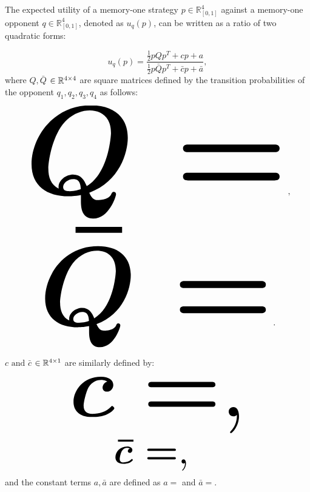 \begin{theorem}\label{theorem:quadratic_form_u}
    The expected utility of a memory-one strategy \(p\in\mathbb{R}_{[0,1]}^4\)
    against a memory-one opponent \(q\in\mathbb{R}_{[0,1]}^4\), denoted
    as \(u_q(p)\), can be written as a ratio of two quadratic forms:

    \begin{equation}\label{eq:optimisation_quadratic}
    u_q(p) = \frac{\frac{1}{2}pQp^T + cp + a}
                {\frac{1}{2}p\bar{Q}p^T + \bar{c}p + \bar{a}},
    \end{equation}
    where \(Q, \bar{Q}\) \(\in \mathbb{R}^{4\times4}\) are square matrices defined by the
    transition probabilities of the opponent \(q_1, q_2, q_3, q_4\) as follows:

    \begin{center}
    \begin{equation}
    \resizebox{0.9\linewidth}{!}{\arraycolsep=2.5pt%
    \boldmath\(
    Q = \)},
    \end{equation}
    \begin{equation}\label{eq:q_bar_matrix}
    \resizebox{0.8\linewidth}{!}{\arraycolsep=2.5pt%
    \boldmath\(
    \bar{Q} =  \)}.
    \end{equation}
    \end{center}

    \(c \text{ and } \bar{c}\) \(\in \mathbb{R}^{4 \times 1}\) are similarly defined by:

    \begin{equation}\label{eq:q_matrix_numerator}
    \resizebox{0.6\linewidth}{!}{\arraycolsep=2.5pt%
    \boldmath\(c = \),}
    \end{equation}
    \begin{equation}\label{eq:q_matrix_denominator}
    \resizebox{0.3\linewidth}{!}{\arraycolsep=2.5pt%
    \boldmath\(\bar{c} = \),
    }
    \end{equation}
    and the constant terms \(a, \bar{a}\) are defined as \(a = \) and
    \(\bar{a} = \).
\end{theorem}

